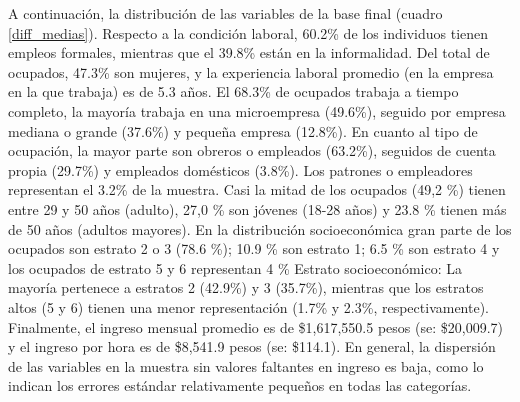 \documentclass[12pt,a4paper,onecolumn]{article}
\begin{document}
A continuación, la distribución de las variables de la base final (cuadro \ref{diff_medias}). Respecto a la condición laboral, 60.2\% de los individuos tienen empleos formales, mientras que el 39.8\% están en la informalidad. Del total de ocupados, 47.3\% son mujeres, y la experiencia laboral promedio (en la empresa en la que trabaja) es de 5.3 años. El 68.3\% de ocupados trabaja a tiempo completo, la mayoría trabaja en una microempresa (49.6\%), seguido por empresa mediana o grande (37.6\%) y pequeña empresa (12.8\%). En cuanto al tipo de ocupación, la mayor parte son obreros o empleados (63.2\%), seguidos de cuenta propia (29.7\%) y empleados domésticos (3.8\%). Los patrones o empleadores representan el 3.2\% de la muestra.
\bigbreak
Casi la mitad de los ocupados (49,2 \%) tienen entre 29 y 50 años (adulto), 27,0 \% son jóvenes (18-28 años) y 23.8 \% tienen más de 50 años (adultos mayores). En la distribución socioeconómica gran parte de los ocupados son estrato 2 o 3 (78.6 \%); 10.9 \% son estrato 1; 6.5 \% son estrato 4 y los ocupados de estrato 5 y 6 representan 4 \% 
\bigbreak
Estrato socioeconómico: La mayoría pertenece a estratos 2 (42.9\%) y 3 (35.7\%), mientras que los estratos altos (5 y 6) tienen una menor representación (1.7\% y 2.3\%, respectivamente). Finalmente, el ingreso mensual promedio es de \$1,617,550.5 pesos (se: \$20,009.7) y el ingreso por hora es de \$8,541.9 pesos (se: \$114.1). En general, la dispersión de las variables en la muestra sin valores faltantes en ingreso es baja, como lo indican los errores estándar relativamente pequeños en todas las categorías.
\end{document}
